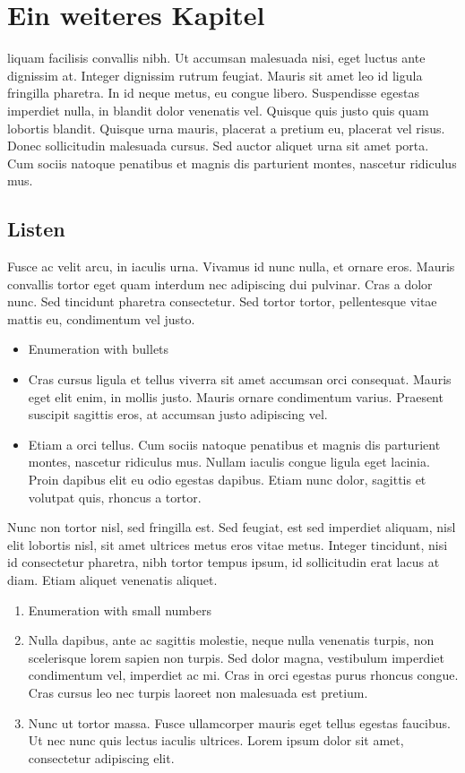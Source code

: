 \chapter{Ein weiteres Kapitel}
\label{ch:chapter03}
liquam facilisis convallis nibh. Ut accumsan malesuada nisi, eget luctus ante dignissim at. Integer dignissim rutrum feugiat. Mauris sit amet leo id ligula fringilla pharetra. In id neque metus, eu congue libero. Suspendisse egestas imperdiet nulla, in blandit dolor venenatis vel. Quisque quis justo quis quam lobortis blandit. Quisque urna mauris, placerat a pretium eu, placerat vel risus. Donec sollicitudin malesuada cursus. Sed auctor aliquet urna sit amet porta. Cum sociis natoque penatibus et magnis dis parturient montes, nascetur ridiculus mus. 

%
%
\section{Listen}
\label{sec:chapter03:listen}
Fusce ac velit arcu, in iaculis urna. Vivamus id nunc nulla, et ornare eros. Mauris convallis tortor eget quam interdum nec adipiscing dui pulvinar. Cras a dolor nunc. Sed tincidunt pharetra consectetur. Sed tortor tortor, pellentesque vitae mattis eu, condimentum vel justo.

\begin{itemize}
 \item Enumeration with bullets
 \item Cras cursus ligula et tellus viverra sit amet accumsan orci consequat. Mauris eget elit enim, in mollis justo. Mauris ornare condimentum varius. Praesent suscipit sagittis eros, at accumsan justo adipiscing vel.
 \item Etiam a orci tellus. Cum sociis natoque penatibus et magnis dis parturient montes, nascetur ridiculus mus. Nullam iaculis congue ligula eget lacinia. Proin dapibus elit eu odio egestas dapibus. Etiam nunc dolor, sagittis et volutpat quis, rhoncus a tortor.
\end{itemize}

Nunc non tortor nisl, sed fringilla est. Sed feugiat, est sed imperdiet aliquam, nisl elit lobortis nisl, sit amet ultrices metus eros vitae metus. Integer tincidunt, nisi id consectetur pharetra, nibh tortor tempus ipsum, id sollicitudin erat lacus at diam. Etiam aliquet venenatis aliquet.

\begin{enumerate}
 \item Enumeration with small numbers
 \item Nulla dapibus, ante ac sagittis molestie, neque nulla venenatis turpis, non scelerisque lorem sapien non turpis. Sed dolor magna, vestibulum imperdiet condimentum vel, imperdiet ac mi. Cras in orci egestas purus rhoncus congue. Cras cursus leo nec turpis laoreet non malesuada est pretium.
 \item Nunc ut tortor massa. Fusce ullamcorper mauris eget tellus egestas faucibus. Ut nec nunc quis lectus iaculis ultrices. Lorem ipsum dolor sit amet, consectetur adipiscing elit.
\end{enumerate}

